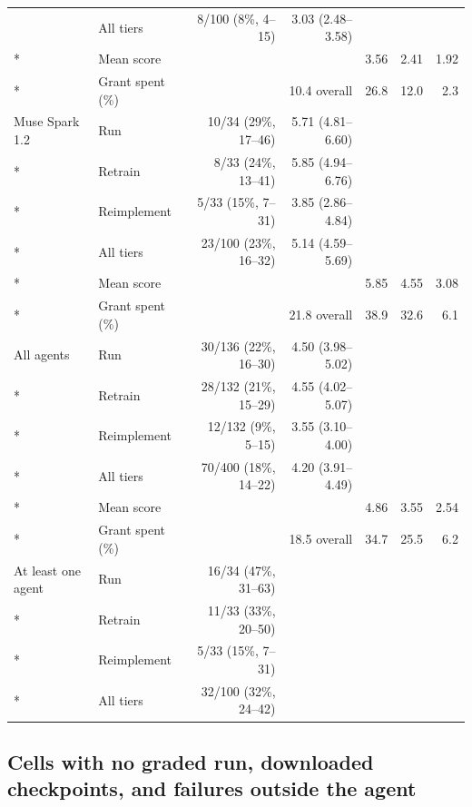 {\begin{longtable}{@{}llrrrrr@{}}
& All tiers & 8/100 (8\%, 4--15) & 3.03 (2.48--3.58) & & & \\*
& Mean score & & & 3.56 & 2.41 & 1.92 \\*
& Grant spent (\%) & \multicolumn{2}{r}{10.4 overall} & 26.8 & 12.0 & 2.3 \\
\midrule
Muse Spark 1.2 & Run & 10/34 (29\%, 17--46) & 5.71 (4.81--6.60) & & & \\*
& Retrain & 8/33 (24\%, 13--41) & 5.85 (4.94--6.76) & & & \\*
& Reimplement & 5/33 (15\%, 7--31) & 3.85 (2.86--4.84) & & & \\*
& All tiers & 23/100 (23\%, 16--32) & 5.14 (4.59--5.69) & & & \\*
& Mean score & & & 5.85 & 4.55 & 3.08 \\*
& Grant spent (\%) & \multicolumn{2}{r}{21.8 overall} & 38.9 & 32.6 & 6.1 \\
\midrule
All agents & Run & 30/136 (22\%, 16--30) & 4.50 (3.98--5.02) & & & \\*
& Retrain & 28/132 (21\%, 15--29) & 4.55 (4.02--5.07) & & & \\*
& Reimplement & 12/132 (9\%, 5--15) & 3.55 (3.10--4.00) & & & \\*
& All tiers & 70/400 (18\%, 14--22) & 4.20 (3.91--4.49) & & & \\*
& Mean score & & & 4.86 & 3.55 & 2.54 \\*
& Grant spent (\%) & \multicolumn{2}{r}{18.5 overall} & 34.7 & 25.5 & 6.2 \\
\midrule
At least one agent & Run & 16/34 (47\%, 31--63) & & & & \\*
& Retrain & 11/33 (33\%, 20--50) & & & & \\*
& Reimplement & 5/33 (15\%, 7--31) & & & & \\*
& All tiers & 32/100 (32\%, 24--42) & & & & \\
\end{longtable}
}

\subsection{Cells with no graded run, downloaded checkpoints, and failures outside the agent}
\label{app:outside-agent}

